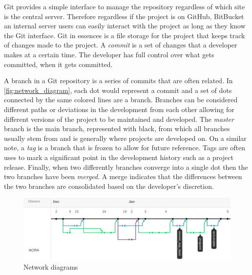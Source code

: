 
\addtocounter{footnote}{1}


Git provides a simple interface to manage the repository regardless of which site is the central server. Therefore regardless if the project is on GitHub, BitBucket an internal server users can easily interact with the project as long as they know the Git interface. Git in essences is a file storage for the project that keeps track of changes made to the project. A \textit{commit} is a set of changes that a developer makes at a certain time. The developer has full control over what gets committed, when it gets committed.

A branch in a Git repository is a series of commits that are often related. In \autoref{fig:network_diagram}, each dot would represent a commit and a set of dots connected by the same colored lines are a branch. Branches can be considered different paths or deviations in the development from each other allowing for different versions of the project to be maintained and developed. The \textit{master} branch is the main branch, represented with black, from which all branches usually stem from and is generally where projects are developed on. On a similar note, a \textit{tag} is a branch that is frozen to allow for future reference. Tags are often uses to mark a significant point in the development history such as a project release. Finally, when two differently branches converge into a single dot then the two branches have been \textit{merged}. A merge indicates that the differences between the two branches are consolidated based on the developer's discretion.

\begin{figure}[!ht]
    \centering
        \includegraphics[width=1.0\textwidth]{images/network}
    \caption{Network diagrams}
    \label{fig:network_diagram}
\end{figure}

